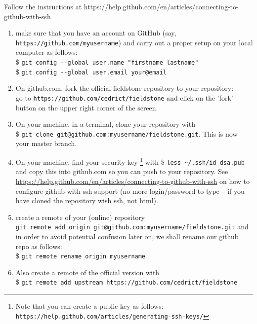 \newpage


 Follow the instructions at https://help.github.com/en/articles/connecting-to-github-with-ssh  

\begin{enumerate}
\item make sure that you  have an account on GitHub (say, \verb"https://github.com/myusername") 
and carry out a proper setup on your local computer as follows:\\
\$ \verb'git config --global user.name "firstname lastname" '\\
\$ \verb'git config --global user.email your@email'

\item On github.com, fork the official fieldstone 
repository to your repository:\\
go to \verb"https://github.com/cedrict/fieldstone" 
and click on the 'fork' button on the upper right corner of the screen.
\item On your machine, in a terminal, clone your repository with \\
\$ \verb"git clone git@github.com:myusername/fieldstone.git". This is now your master branch.

\item On your machine, find your security key \footnote{
Note that you can create a public key as follows: 
{\tt https://help.github.com/articles/generating-ssh-keys/}}
 with \$ \verb"less ~/.ssh/id_dsa.pub" and copy this into github.com 
so you can push to your repository. See \url{https://help.github.com/en/articles/connecting-to-github-with-ssh} on how to configure github with ssh support (no more login/password to type -- if you have cloned the repository wish ssh, not html).
 
\item create a remote of your (online) repository\\
\verb"git remote add origin git@github.com:myusername/fieldstone.git"
and in order to avoid potential confusion later on, we shall rename our github repo as follows:\\
\$ \verb"git remote rename origin myusername" 

\item Also create a remote of the official version with\\
\$ \verb"git remote add upstream https://github.com/cedrict/fieldstone"

\end{enumerate}


